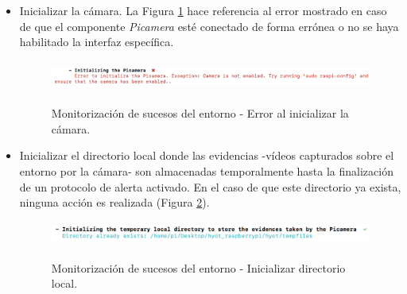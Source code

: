 \documentclass[12pt,a4paper, twoside]{report}
\begin{document}
\begin{itemize}
	 	\item Inicializar la cámara. La Figura \ref{fig:userguide_monitoring_cameraError} hace referencia al error mostrado en caso de que el componente \textit{Picamera} esté conectado de forma errónea o no se haya habilitado la interfaz específica.
	 	
	 \begin{figure}[!ht]   
		\caption{Monitorización de sucesos del entorno - Error al inicializar la cámara.} 
		\begin{center} 
			\includegraphics[width=14cm,height=1cm]{Images/userGuide/monitoring/cameraError} \\
			\label{fig:userguide_monitoring_cameraError} 
		\end{center}  
	\end{figure}
	 	
	 	\item Inicializar el directorio local donde las evidencias -vídeos capturados sobre el entorno por la cámara- son almacenadas temporalmente hasta la finalización de un protocolo de alerta activado. En el caso de que este directorio ya exista, ninguna acción es realizada (Figura \ref{fig:userguide_monitoring_localDir}).
	 	
	 		\begin{figure}[!ht]   
				\caption{Monitorización de sucesos del entorno - Inicializar directorio local.} 
				\begin{center} 
					\includegraphics[width=14cm,height=0.8cm]{Images/userGuide/monitoring/localDir} \\
					\label{fig:userguide_monitoring_localDir} 
				\end{center}  
			\end{figure}
	 	

\end{itemize}
\end{document}
